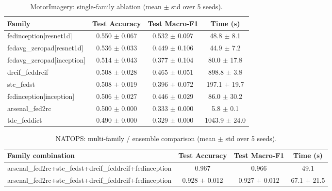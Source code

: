 \begin{table}[t]
\centering
\caption{MotorImagery: single-family ablation (mean $\pm$ std over 5 seeds).}
\label{tab:results_motorimagery_ablation}
\begin{tabular}{lccc}
\toprule
Family & Test Accuracy & Test Macro-F1 & Time (s) \\
\midrule
fedinception[resnet1d] & 0.550 $\pm$ 0.067 & 0.532 $\pm$ 0.097 & 48.8 $\pm$ 8.1 \\
fedavg\_zeropad[resnet1d] & 0.536 $\pm$ 0.033 & 0.449 $\pm$ 0.106 & 44.9 $\pm$ 7.2 \\
fedavg\_zeropad[inception] & 0.514 $\pm$ 0.043 & 0.377 $\pm$ 0.104 & 80.0 $\pm$ 17.8 \\
drcif\_feddrcif & 0.508 $\pm$ 0.028 & 0.465 $\pm$ 0.051 & 898.8 $\pm$ 3.8 \\
stc\_fedst & 0.508 $\pm$ 0.019 & 0.396 $\pm$ 0.072 & 197.1 $\pm$ 19.7 \\
fedinception[inception] & 0.506 $\pm$ 0.027 & 0.446 $\pm$ 0.029 & 86.0 $\pm$ 30.2 \\
arsenal\_fed2rc & 0.500 $\pm$ 0.000 & 0.333 $\pm$ 0.000 & 5.8 $\pm$ 0.1 \\
tde\_feddict & 0.490 $\pm$ 0.000 & 0.329 $\pm$ 0.000 & 1043.9 $\pm$ 24.0 \\
\bottomrule
\end{tabular}
\end{table}

\begin{table}[t]
\centering
\caption{NATOPS: multi-family / ensemble comparison (mean $\pm$ std over 5 seeds).}
\label{tab:results_natops_ensemble}
\begin{tabular}{lccc}
\toprule
Family combination & Test Accuracy & Test Macro-F1 & Time (s) \\
\midrule
arsenal\_fed2rc+stc\_fedst+drcif\_feddrcif+fedinception & 0.967 & 0.966 & 49.1 \\
arsenal\_fed2rc+stc\_fedst+drcif\_feddrcif+fedinception & 0.928 $\pm$ 0.012 & 0.927 $\pm$ 0.012 & 67.1 $\pm$ 21.5 \\
\bottomrule
\end{tabular}
\end{table}

